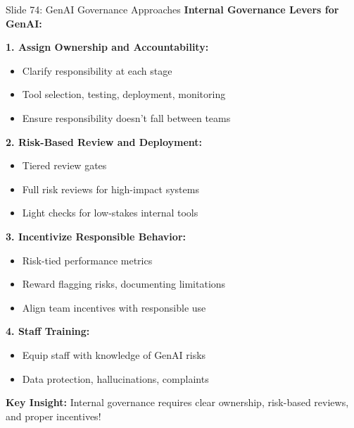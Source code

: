 \documentclass[8pt]{beamer}
\begin{document}
	\begin{frame}{Slide 74: GenAI Governance Approaches}
		\fontsize{6.5}{7.5}\selectfont
		\textbf{Internal Governance Levers for GenAI:}
		
		\vspace{0.1cm}
		\textbf{1. Assign Ownership and Accountability:}
		\begin{itemize}
			\item Clarify responsibility at each stage
			\item Tool selection, testing, deployment, monitoring
			\item Ensure responsibility doesn't fall between teams
		\end{itemize}
		
		\vspace{0.1cm}
		\textbf{2. Risk-Based Review and Deployment:}
		\begin{itemize}
			\item Tiered review gates
			\item Full risk reviews for high-impact systems
			\item Light checks for low-stakes internal tools
		\end{itemize}
		
		\vspace{0.1cm}
		\textbf{3. Incentivize Responsible Behavior:}
		\begin{itemize}
			\item Risk-tied performance metrics
			\item Reward flagging risks, documenting limitations
			\item Align team incentives with responsible use
		\end{itemize}
		
		\vspace{0.1cm}
		\textbf{4. Staff Training:}
		\begin{itemize}
			\item Equip staff with knowledge of GenAI risks
			\item Data protection, hallucinations, complaints
		\end{itemize}
		
		\textcolor{myblue}{\textbf{Key Insight:}} Internal governance requires \textcolor{myblue}{clear ownership, risk-based reviews, and proper incentives}!
	\end{frame}
	
\end{document}
